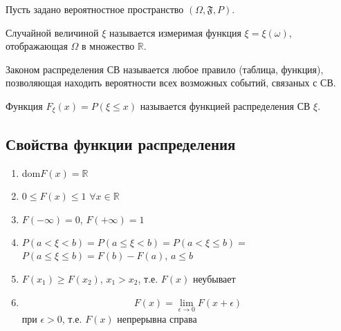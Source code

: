 Пусть задано вероятностное пространство $(\Omega, \mathfrak{F}, P)$.

\begin{definition}
Случайной величиной $\xi$ называется измеримая функция $\xi = \xi(\omega)$,
отображающая $\Omega$ в множество $\mathbb{R}$.
\end{definition}

\begin{definition}
Законом распределения СВ называется любое правило (таблица, функция), позволяющая находить вероятности
всех возможных событий, связаных с СВ.
\end{definition}

\begin{definition}
Функция $F_\xi(x) = P(\xi \leq x)$ называется функцией распределения СВ $\xi$.
\end{definition}

\subsection{Свойства функции распределения}
\begin{enumerate}
    \item dom$F(x) = \mathbb{R}$
    \item $0 \leq F(x) \leq 1$ $\forall x \in \mathbb{R}$
    \item $F(-\infty) = 0$, $F(+\infty) = 1$
    \item $P(a < \xi < b) = P(a \leq \xi < b) = P(a < \xi \leq b) =$ \\
          $P(a \leq \xi \leq b) = F(b) - F(a)$, $a \leq b$
    \item $F(x_1) \geq F(x_2)$, $x_1 > x_2$, т.е. $F(x)$ неубывает
    \item $$F(x) = \lim_{\epsilon \to 0}{F(x + \epsilon)}$$ при $\epsilon > 0$, т.е. $F(x)$ непрерывна справа
\end{enumerate}
